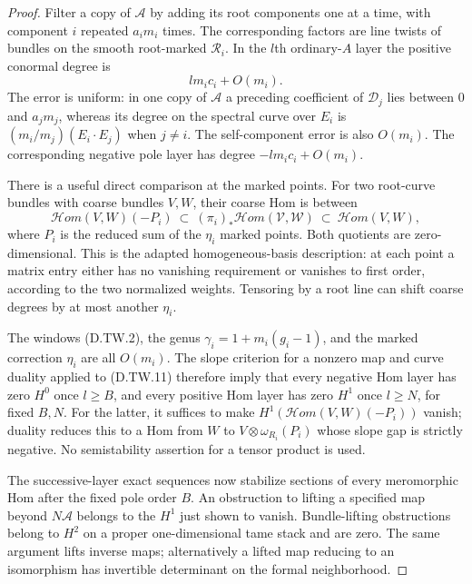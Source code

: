 \begin{proof}
Filter a copy of $\mathcal A$ by adding its root
components one at a time, with component $i$ repeated
$a_i m_i$ times. The corresponding factors are line
twists of bundles on the smooth root-marked
$\mathcal R_i$. In the $l$th ordinary-$A$ layer the
positive conormal degree is
\[
                 l m_i c_i+O(m_i).                   \tag{D.TW.10}
\]
The error is uniform: in one copy of $\mathcal A$ a
preceding coefficient of $\mathcal D_j$ lies between
$0$ and $a_jm_j$, whereas its degree on the spectral
curve over $E_i$ is $(m_i/m_j)(E_i\cdot E_j)$ when
$j\ne i$. The self-component error is also $O(m_i)$.
The corresponding negative pole layer has degree
$-l m_i c_i+O(m_i)$.

There is a useful direct comparison at the marked
points. For two root-curve bundles with coarse bundles
$V,W$, their coarse Hom is between
\[
 \mathcal Hom(V,W)(-P_i)\ \subset\
  (\pi_i)_*\mathcal Hom(\mathcal V,\mathcal W)
   \ \subset\ \mathcal Hom(V,W),
                                                        \tag{D.TW.11}
\]
where $P_i$ is the reduced sum of the $\eta_i$ marked
points. Both quotients are zero-dimensional. This is
the adapted homogeneous-basis description: at each
point a matrix entry either has no vanishing requirement
or vanishes to first order, according to the two
normalized weights. Tensoring by a root line can
shift coarse degrees by at most another $\eta_i$.

The windows (D.TW.2), the genus
$\gamma_i=1+m_i(g_i-1)$, and the marked correction
$\eta_i$ are all $O(m_i)$. The slope criterion for a
nonzero map and curve duality applied to (D.TW.11)
therefore imply that every negative Hom layer has
zero $H^0$ once $l\geq B$, and every positive Hom
layer has zero $H^1$ once $l\geq N$, for fixed
$B,N$. For the latter, it suffices to make
$H^1(\mathcal Hom(V,W)(-P_i))$ vanish; duality reduces
this to a Hom from $W$ to
$V\otimes\omega_{R_i}(P_i)$ whose slope gap is
strictly negative. No semistability assertion for
a tensor product is used.

The successive-layer exact sequences now stabilize
sections of every meromorphic Hom after the fixed
pole order $B$. An obstruction to lifting a specified
map beyond $N\mathcal A$ belongs to the $H^1$ just
shown to vanish. Bundle-lifting obstructions belong
to $H^2$ on a proper one-dimensional tame stack and
are zero. The same argument lifts inverse maps;
alternatively a lifted map reducing to an isomorphism
has invertible determinant on the formal neighborhood.


\end{proof}
